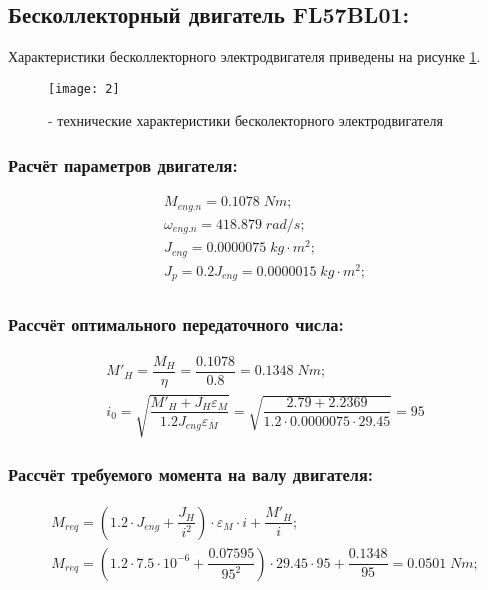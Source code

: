 \newpage

\subsection{Бесколлекторный двигатель FL57BL01:}
Характеристики бесколлекторного электродвигателя приведены на рисунке \ref{pic:pic_2}.
\begin{figure}[H]
	\begin{center}
		\texttt{[image: 2]}
		\caption{- технические характеристики бесколекторного электродвигателя} 
		\label{pic:pic_2} %
	\end{center}
\end{figure}

\subsubsection{Расчёт параметров двигателя:}
\begin{equation}
	\begin{split}
		&M_{eng.n}=0.1078\; Nm;\\
		&\omega_{eng.n} = 418.879\; rad/s;\\
		&J_{eng} = 0.0000075\; kg\cdot m^2;\\
		&J_p=0.2J_{eng}=0.0000015\; kg\cdot m^2;\\
	\end{split}			
\end{equation}

\subsubsection{Рассчёт оптимального передаточного числа:}
\begin{equation}
	\begin{split}
		&{M'}_H=\dfrac{M_H}{\eta}=\dfrac{0.1078}{0.8}=0.1348\; Nm;\\
		&i_0=\sqrt{\dfrac{{M'}_H+J_H \varepsilon_M}{1.2J_{eng} \varepsilon_M}} = \sqrt{\dfrac{2.79+2.2369}{1.2\cdot 0.0000075\cdot 29.45}} = 95
	\end{split}			
\end{equation}

\subsubsection{Рассчёт требуемого момента на валу двигателя:}
\begin{equation}
	\begin{split}
		&M_{req}=\left( 1.2\cdot J_{eng} +\dfrac{J_H}{i^2} \right)\cdot \varepsilon_M\cdot i + \dfrac{{M'}_H}{i};\\
		&M_{req}=\left( 1.2\cdot 7.5\cdot 10^{-6} +\dfrac{0.07595}{95^2} \right)\cdot 29.45\cdot 95 + \dfrac{0.1348}{95}=0.0501\; Nm;\\
	\end{split}			
\end{equation}

